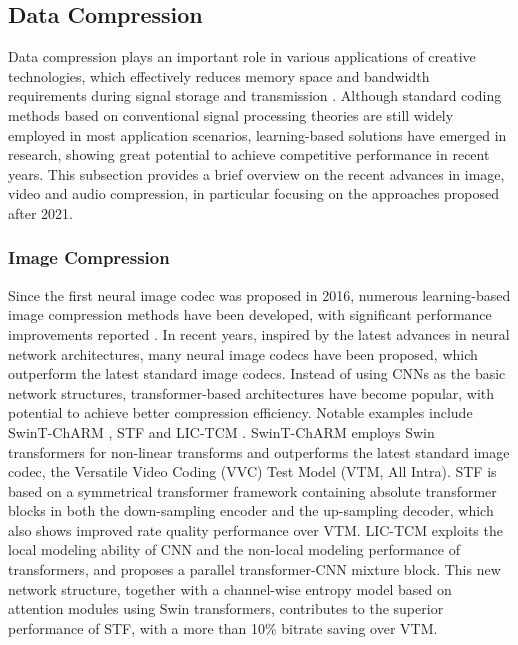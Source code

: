 \documentclass[11pt,a4paper]{article}
\begin{document}
\subsection{Data Compression}
\label{ssec:compression}

Data compression plays an important role in various applications of creative technologies, which effectively reduces memory space and bandwidth requirements during signal storage and transmission \cite{Bull:intelligent:2021}. Although standard coding methods based on conventional signal processing theories are still widely employed in most application scenarios, learning-based solutions have emerged in research, showing great potential to achieve competitive performance in recent years. This subsection provides a brief overview on the recent advances in image, video and audio compression, in particular focusing on the approaches proposed after 2021.

\subsubsection{Image Compression}

Since the first neural image codec \cite{balle2016density} was proposed in 2016, numerous learning-based image compression methods have been developed, with significant performance improvements reported \cite{balle2018variational,cheng2020learned}. In recent years, inspired by the latest advances in neural network architectures, many neural image codecs have been proposed, which outperform the latest standard image codecs. Instead of using CNNs as the basic network structures, transformer-based architectures have become popular, with potential to achieve better compression efficiency.  Notable examples include SwinT-ChARM \cite{zhu2022transformer}, STF \cite{zou2022devil} and LIC-TCM \cite{liu2023learned}. SwinT-ChARM \cite{zhu2022transformer} employs Swin transformers for non-linear transforms and outperforms the latest standard image codec, the Versatile Video Coding (VVC) Test Model (VTM, All Intra). STF \cite{zou2022devil} is based on a symmetrical transformer framework containing absolute transformer blocks in both the down-sampling encoder and the up-sampling decoder, which also shows improved rate quality performance over VTM. LIC-TCM \cite{liu2023learned} exploits the local modeling ability of CNN and the non-local modeling performance of transformers, and proposes a parallel transformer-CNN mixture block. This new network structure, together with a channel-wise entropy model based on attention modules using Swin transformers, contributes to the superior performance of STF, with a more than 10\% bitrate saving over VTM. 
\end{document}
